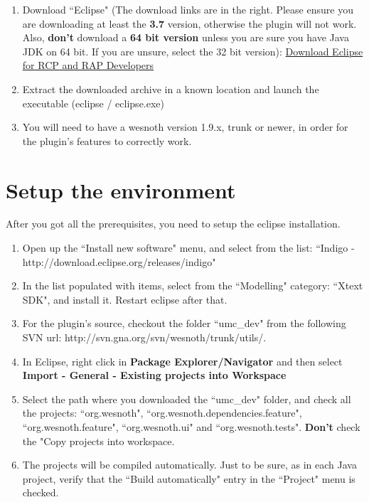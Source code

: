 \documentclass[10pt]{article}
\begin{document}
\begin{enumerate}
\item Download ``Eclipse" (The download links are in the right. Please ensure you are downloading at least the \textbf{3.7} version, otherwise the plugin will not work. Also, \textbf{don't} download a \textbf{64 bit version} unless you are sure you have Java JDK on 64 bit. If you are unsure, select the 32 bit version):  \href{http://eclipse.org/downloads/packages/eclipse-rcp-and-rap-developers/indigor}{Download Eclipse for RCP and RAP Developers}

\item Extract the downloaded archive in a known location and launch the executable (eclipse / eclipse.exe)

\item You will need to have a wesnoth version 1.9.x, trunk or newer, in order for the plugin's features to correctly work.
\end{enumerate}

\section{Setup the environment}
After you got all the prerequisites, you need to setup the eclipse installation.

\begin{enumerate}
\item Open up the ``Install new software" menu, and select from the list: ``Indigo - http://download.eclipse.org/releases/indigo"

\item In the list populated with items, select from the ``Modelling" category: ``Xtext SDK", and install it. Restart eclipse after that.

\item For the plugin's source, checkout the folder ``umc\_dev" from the following SVN url: http://svn.gna.org/svn/wesnoth/trunk/utils/.

\item In Eclipse, right click in \textbf{Package Explorer/Navigator} and then select \textbf{Import - General - Existing projects into Workspace}

\item Select the path where you downloaded the ``umc\_dev" folder, and check all the projects: ``org.wesnoth", ``org.wesnoth.dependencies.feature", ``org.wesnoth.feature", ``org.wesnoth.ui" and ``org.wesnoth.tests". \textbf{Don't} check the "Copy projects into workspace.

\item The projects will be compiled automatically. Just to be sure, as in each Java project, verify that the ``Build automatically" entry in the ``Project" menu is checked.
\end{enumerate}
\end{document}
